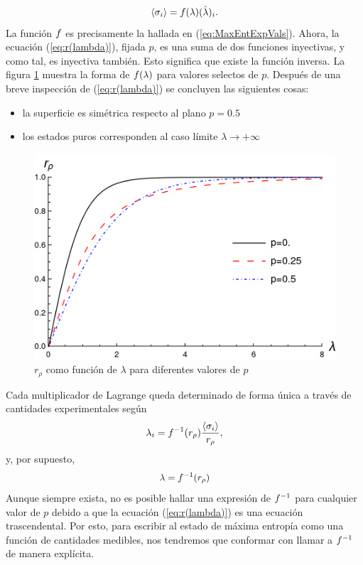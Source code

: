 \begin{equation}
    \expval{\sigma_{i}}=f(\lambda)(\hat{\lambda})_{i}.
\end{equation}
La función $f$ es precisamente la hallada en (\ref{eq:MaxEntExpVals}). Ahora, la ecuación (\ref{eq:r(lambda)}), fijada $p$, es una suma de dos funciones inyectivas, y como tal, es inyectiva también. Esto significa que existe la función inversa. La figura \ref{fig:r(lambda)} muestra la forma de $f(\lambda)$ para valores selectos de $p$. Después de una breve inspección de (\ref{eq:r(lambda)}) se concluyen las siguientes cosas:
\begin{itemize}
\item la superficie es simétrica respecto al plano $p=0.5$
\item los estados puros corresponden al caso límite $\lambda\rightarrow+\infty$
\end{itemize}
\begin{figure}[ht]
    \centering
    \includegraphics[width=0.6\linewidth]{chapter2/figures/r(lambda).png}
    \caption{$r_{\rho}$ como función de $\lambda$ para diferentes valores de $p$}
    \label{fig:r(lambda)}
\end{figure}
Cada multiplicador de Lagrange queda determinado de forma única a través de cantidades experimentales según 
\begin{equation}
    \lambda_{i}=f^{-1}(r_{\rho}) \frac{\expval{\sigma_{i}}}{r_{\rho}},
\end{equation}
y, por supuesto,
\begin{equation*}
    \lambda=f^{-1}(r_{\rho})
\end{equation*}
Aunque siempre exista, no es posible hallar una expresión de $f^{-1}$ para cualquier valor de $p$ debido a que la ecuación (\ref{eq:r(lambda)}) es una ecuación trascendental. Por esto, para escribir al estado de máxima entropía como una función de cantidades medibles, nos tendremos que conformar con llamar a $f^{-1}$ de manera explícita.

